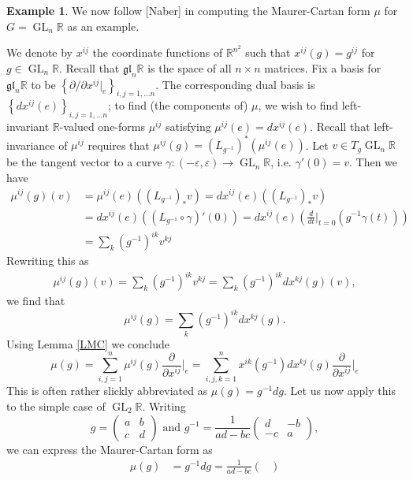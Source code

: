\documentclass{book}
\newcommand{\R}{\mathbb{R}}
\newcommand{\fr}{\mathfrak}
\DeclareMathOperator{\GL}{GL}
\theoremstyle{plain}
\theoremstyle{definition}
\newtheorem{exmp}{Example}
\theoremstyle{remark}
\begin{document}
\begin{exmp}
    We now follow [Naber] in computing the Maurer-Cartan form $\mu$ for $G=\GL_n\R$ as an example. 

    We denote by $x^{ij}$ the coordinate functions of $\R^{n^2}$ such that $x^{ij}(g)=g^{ij}$ for $g\in\GL_n\R$. Recall that $\fr{gl}_n\R$ is the space of
    all $n\times n$ matrices. Fix a basis for $\fr {gl}_n\R$ to be $\left\{ \partial/\partial x^{ij}|_{e} \right\}_{i,j=1,\ldots n}$.
    The corresponding dual basis is $\left\{ dx^{ij}(e) \right\}_{i,j=1,\ldots n}$; to find (the components of) $\mu$, we wish to
    find left-invariant $\R$-valued one-forms $\mu^{ij}$ satisfying $\mu^{ij}(e)=dx^{ij}(e)$. Recall that left-invariance of $\mu^{ij}$ requires that
    $\mu^{ij}(g)=\left( L_{g^{-1}} \right)^*(\mu^{ij}(e))$. Let $v\in T_g\GL_n\R$ be the tangent vector to a curve $\gamma:(-\varepsilon,\varepsilon)\to\GL_n\R$,
    i.e. $\gamma'(0)=v$. Then we have
    \begin{align*}
        \mu^{ij}(g)(v)&=\mu^{ij}(e)\left( (L_{g^{-1}})_*v \right)=dx^{ij}(e)\left( (L_{g^{-1}})_*v \right)\\
        &=dx^{ij}(e)\left( (L_{g^{-1}}\circ\gamma)'(0) \right)=dx^{ij}(e)\left(\frac{d}{dt}\bigg|_{t=0}(g^{-1}\gamma(t))  \right)\\
        &=\sum_k\left(g^{-1}\right)^{ik}v^{kj}
    \end{align*}
    Rewriting this as
    \begin{align*}
        \mu^{ij}(g)(v)=\sum_k\left(g^{-1}\right)^{ik}v^{kj}=\sum_k(g^{-1})^{ik}dx^{kj}(g)(v),
    \end{align*}
    we find that
    \[\mu^{ij}(g)=\sum_k (g^{-1})^{ik}dx^{kj}(g).\]
    Using Lemma \ref{LMC} we conclude
    \[\mu(g)=\sum_{i,j=1}^n\mu^{ij}(g)\frac{\partial}{\partial x^{ij}}\bigg|_{e}=\sum_{i,j,k=1}^nx^{ik}(g^{-1})dx^{kj}(g)\frac{\partial}{\partial x^{ij}}\bigg|_{e}\]
    This is often rather slickly abbreviated as $\mu(g)=g^{-1}dg$. Let us now apply this to the simple case of $\GL_2\R$. Writing
    \[g=\begin{pmatrix}
            a&b\\c&d
        \end{pmatrix}\text{ and }g^{-1}=\frac{1}{ad-bc}\begin{pmatrix}
            d&-b\\-c&a
        \end{pmatrix},
    \]
    we can express the Maurer-Cartan form as
    \begin{align*}
        \mu(g)&=g^{-1}dg=\frac{1}{ad-bc}\begin{pmatrix}

\end{pmatrix}
\end{align*}
\end{exmp}
\end{document}
